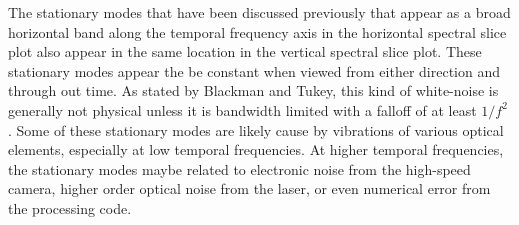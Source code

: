 The stationary modes that have been discussed previously that appear as a broad horizontal band along the temporal frequency axis in the horizontal spectral slice plot also appear in the same location in the vertical spectral slice plot.
These stationary modes appear the be constant when viewed from either direction and through out time.
As stated by Blackman and Tukey, this kind of white-noise is generally not physical unless it is bandwidth limited with a falloff of at least $1/f^2$ \cite{Blackman-1958-4QtKgDb8}.
Some of these stationary modes are likely cause by vibrations of various optical elements, especially at low temporal frequencies.
At higher temporal frequencies, the stationary modes maybe related to electronic noise from the high-speed camera, higher order optical noise from the laser, or even numerical error from the processing code.

